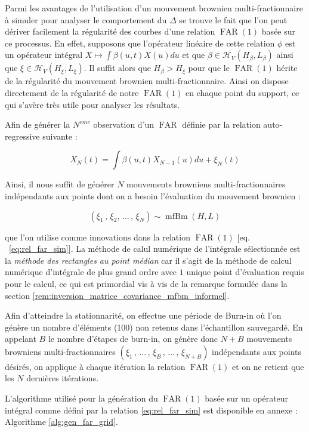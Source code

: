 
Parmi les avantages de l'utilisation d'un mouvement brownien multi-fractionnaire à simuler pour analyser le comportement du $\Delta$ se trouve le fait que l'on peut dériver facilement la régularité des courbes d'une relation $\operatorname{FAR}(1)$ basée sur ce processus. En effet, supposons que l'opérateur linéaire de cette relation $\phi$ est un opérateur intégral $X \mapsto \int \beta(u,t) X(u)du$ et que $\beta \in \mathcal H_V(H_\beta, L_\beta)$ ainsi que $\xi \in \mathcal H_V(H_\xi, L_\xi)$. Il suffit alors que $H_\beta > H_\xi$ pour que le $\operatorname{FAR}(1)$ hérite de la régularité du mouvement brownien multi-fractionnaire. Ainsi on dispose directement de la régularité de notre $\operatorname{FAR}(1)$ en chaque point du support, ce qui s'avère très utile pour analyser les résultats.

\bigskip

\noindent Afin de générer la $N^{eme}$ observation d'un $\operatorname{FAR}$ définie par la relation auto-regressive suivante :

\begin{equation}
	X_N(t) = \int \beta(u,t)X_{N-1}(u)du + \xi_N(t) \label{eq:rel_far_sim}
\end{equation}

Ainsi, il nous suffit de générer $N$ mouvements browniens multi-fractionnaires indépendants aux points dont on a besoin l'évaluation du mouvement brownien :

\begin{equation*}
	(\xi_1 \,,\, \xi_2,\, \dots \,,\, \xi_N ) \sim \operatorname{mfBm}(H, L)
\end{equation*}



\noindent que l'on utilise comme innovations dans la relation $\operatorname{FAR}(1)$ $\bigl[$eq. ~\ref{eq:rel_far_sim}$\bigr]$. La méthode de calul numérique de l'intégrale sélectionnée est la \emph{méthode des rectangles au point médian} car il s'agit de la méthode de calcul numérique d'intégrale de plus grand ordre avec $1$ unique point d'évaluation requis pour le calcul, ce qui est primordial vis à vis de la remarque formulée dans la section \ref{rem:inversion_matrice_covariance_mfbm_informel}.

\bigskip

Afin d'atteindre la stationnarité, on effectue une période de \og Burn-in \fg où l'on génère un nombre d'éléments (100) non retenus dans l'échantillon sauvegardé. En appelant $B$ le nombre d'étapes de burn-in, on génère donc $N+B$ mouvements browniens multi-fractionnaires $(\xi_1 \,,\, \dots \,,\,\xi_B\,,\, \dots \,, \,\xi_{N+B} )$ indépendants aux points désirés, on applique à chaque itération la relation $\operatorname{FAR}(1)$ et on ne retient que les $N$ dernières itérations.

\bigskip

\noindent L'algorithme utilisé pour la génération du $\operatorname{FAR}(1)$ basée sur un opérateur intégral comme défini par la relation \ref{eq:rel_far_sim} est disponible en annexe : Algorithme \ref{alg:gen_far_grid}.
